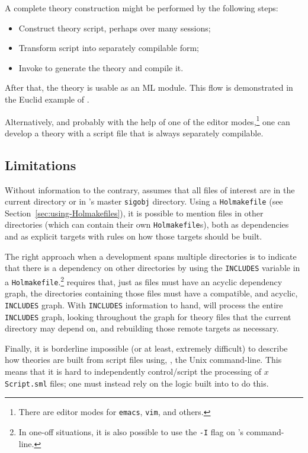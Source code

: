 A complete theory construction might be performed by the following steps:
\begin{itemize}
\item Construct theory script, perhaps over many sessions;
\item Transform script into separately compilable form;
\item Invoke \holmake{} to generate the theory and compile it.
\end{itemize}
After that, the theory is usable as an ML module.
This flow is demonstrated in the Euclid example of \TUTORIAL.

Alternatively, and probably with the help of one of the editor modes,\footnote{There are editor modes for \texttt{emacs}, \texttt{vim}, and others.} one can develop a theory with a script file that is always separately compilable.

\subsection{\holmake{} Limitations}

Without information to the contrary, \holmake{} assumes that all files of interest are in the current directory or in \HOL{}'s master \texttt{sigobj} directory.
Using a \texttt{Holmakefile} (see Section~\ref{sec:using-Holmakefiles}), it is possible to mention files in other directories (which can contain their own \texttt{Holmakefile}s), both as dependencies and as explicit targets with rules on how those targets should be built.

%
%
The right approach when a development spans multiple directories is to indicate that there is a dependency on other directories by using the \texttt{INCLUDES} variable in a \texttt{Holmakefile}.\footnote{In one-off situations, it is also possible to use the \texttt{-I} flag on \holmake{}'s command-line.}
\holmake{} requires that, just as files must have an acyclic dependency graph, the directories containing those files must have a compatible, and acyclic, \texttt{INCLUDES} graph.
With \texttt{INCLUDES} information to hand, \holmake{} will process the entire \texttt{INCLUDES} graph, looking throughout the graph for theory files that the current directory may depend on, and rebuilding those remote targets as necessary.

Finally, it is borderline impossible (or at least, extremely difficult) to describe how theories are built from script files using, \eg, the Unix command-line.
This means that it is hard to independently control/script the processing of $x$\texttt{Script.sml} files; one must instead rely on the logic built into \holmake{} to do this.


